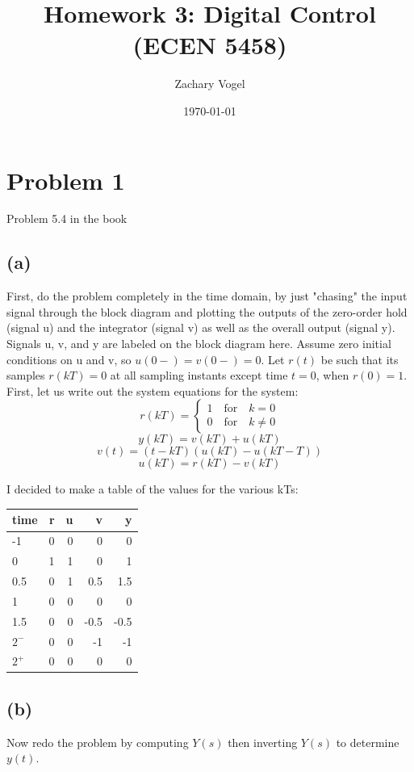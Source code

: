 \documentclass{article}
\title{Homework 3: Digital Control (ECEN 5458)}
\author{Zachary Vogel}
\date{\today}
\begin{document}
\maketitle

\section*{Problem 1}
Problem 5.4 in the book

\subsection*{(a)}
First, do the problem completely in the time domain, by just "chasing" the input signal through the block diagram and plotting the outputs of the zero-order hold (signal u) and the integrator (signal v) as well as the overall output (signal y). Signals u, v, and y are labeled on the block diagram here. Assume zero initial conditions on u and v, so $u(0-)=v(0-)=0$. Let $r(t)$ be such that its samples $r(kT)=0$ at all sampling instants except time $t=0$, when $r(0)=1$.\\


First, let us write out the system equations for the system:
\[r(kT)=\left \{\begin{array}{c}1\quad \text{for}\quad k=0\\0\quad \text{for}\quad k\neq 0\end{array}\right .\]
\[y(kT)=v(kT)+u(kT)\]
\[v(t)=(t-kT)(u(kT)-u(kT-T))\]
\[u(kT)=r(kT)-v(kT)\]

I decided to make a table of the values for the various kTs:
\begin{table}[H]
    \centering
    \begin{tabular}{|l|r|r|r|r|}
        \hline
        time & r & u & v & y\\\hline
        -1   & 0 & 0 & 0 & 0\\\hline
        0   & 1 & 1 & 0 & 1\\\hline
        0.5 & 0 & 1 & 0.5 & 1.5\\\hline
        1   & 0 & 0& 0 & 0\\\hline
        1.5 & 0 & 0 & -0.5 & -0.5\\\hline
        $2^-$   & 0 & 0 & -1 & -1\\\hline
        $2^+$ & 0 & 0 & 0 &0\\\hline
    \end{tabular}
\end{table}

\subsection*{(b)}
Now redo the problem by computing $Y(s)$ then inverting $Y(s)$ to determine $y(t)$.
\end{document}
